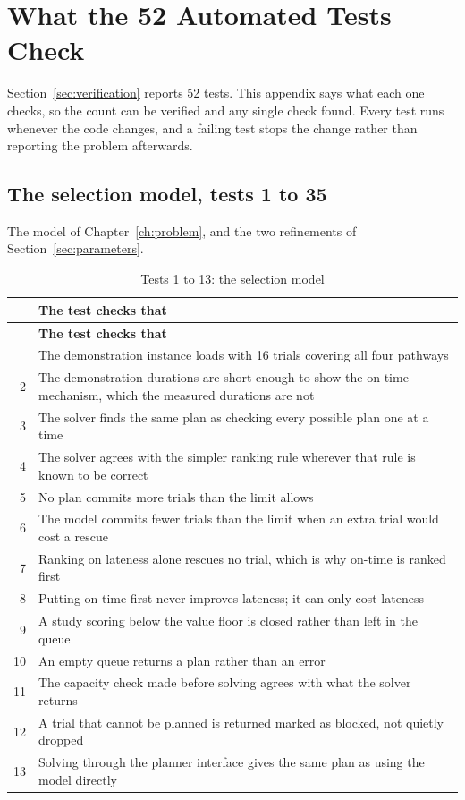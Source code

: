 
\chapter{What the 52 Automated Tests Check}
\label{app:tests}

Section~\ref{sec:verification} reports 52 tests. This appendix says what each one checks, so the count can be verified and any single check found. Every test runs whenever the code changes, and a failing test stops the change rather than reporting the problem afterwards.

\section{The selection model, tests 1 to 35}
\label{sec:testsmodel}

The model of Chapter~\ref{ch:problem}, and the two refinements of Section~\ref{sec:parameters}.

\begin{longtable}{@{}rp{}@{}}
  \caption{Tests 1 to 13: the selection model}
  \label{tab:tests1}\\
  \toprule
  & \textbf{The test checks that} \\
  \midrule
  \endfirsthead
  \toprule
  & \textbf{The test checks that} \\
  \midrule
  \endhead
  \bottomrule
  \endfoot
  1  & The demonstration instance loads with 16 trials covering all four pathways \\
  2  & The demonstration durations are short enough to show the on-time mechanism, which the measured durations are not \\
  3  & The solver finds the same plan as checking every possible plan one at a time \\
  4  & The solver agrees with the simpler ranking rule wherever that rule is known to be correct \\
  5  & No plan commits more trials than the limit allows \\
  6  & The model commits fewer trials than the limit when an extra trial would cost a rescue \\
  7  & Ranking on lateness alone rescues no trial, which is why on-time is ranked first \\
  8  & Putting on-time first never improves lateness; it can only cost lateness \\
  9  & A study scoring below the value floor is closed rather than left in the queue \\
  10 & An empty queue returns a plan rather than an error \\
  11 & The capacity check made before solving agrees with what the solver returns \\
  12 & A trial that cannot be planned is returned marked as blocked, not quietly dropped \\
  13 & Solving through the planner interface gives the same plan as using the model directly \\
\end{longtable}

